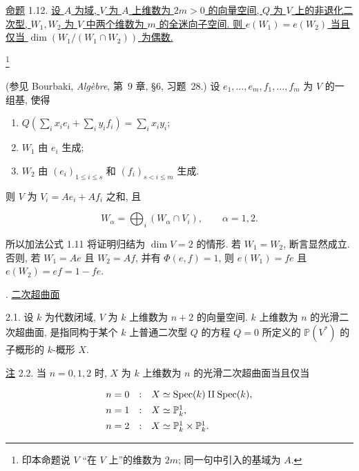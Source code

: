 \underline{命题} 1.12. \underline{设 $A$ 为域, $V$ 为 $A$ 上维数为 $2m>0$ 的向量空间, $Q$ 为 $V$ 上的非退化二次型, $W_1,W_2$ 为 $V$ 中两个维数为 $m$ 的全迷向子空间. 则 $e(W_1)=e(W_2)$ 当且仅当 $\dim(W_1/(W_1\cap W_2))$ 为偶数.}

\footnote{印本命题说 $V$ ``在 $V$ 上''的维数为 $2m$; 同一句中引入的基域为 $A$.}


(参见 Bourbaki, \emph{Algèbre}, 第~9 章, \S6, 习题~28.) 设 $e_1,\ldots,e_m,f_1,\ldots,f_m$ 为 $V$ 的一组基, 使得

\begin{enumerate}[label=\alph*),leftmargin=2.5em]
\item $Q(\sum_i x_i e_i+\sum_i y_i f_i)=\sum_i x_i y_i$;
\item $W_1$ 由 $e_i$ 生成;
\item $W_2$ 由 $(e_i)_{1\leq i\leq s}$ 和 $(f_i)_{s<i\leq m}$ 生成.
\end{enumerate}

则 $V$ 为 $V_i=Ae_i+Af_i$ 之和, 且

\begin{equation*}
W_\alpha=\bigoplus_i(W_\alpha\cap V_i),
\qquad \alpha=1,2.
\end{equation*}

所以加法公式 1.11 将证明归结为 $\dim V=2$ 的情形. 若 $W_1=W_2$, 断言显然成立. 否则, 若 $W_1=Ae$ 且 $W_2=Af$, 并有 $\Phi(e,f)=1$, 则 $e(W_1)=fe$ 且 $e(W_2)=ef=1-fe$.

. \underline{二次超曲面}

2.1. 设 $k$ 为代数闭域, $V$ 为 $k$ 上维数为 $n+2$ 的向量空间. $k$ 上维数为 $n$ 的光滑二次超曲面, 是指同构于某个 $k$ 上普通二次型 $Q$ 的方程 $Q=0$ 所定义的 $\mathbb P(V^*)$ 的子概形的 $k$-概形 $X$.

\underline{注} 2.2. 当 $n=0,1,2$ 时, $X$ 为 $k$ 上维数为 $n$ 的光滑二次超曲面当且仅当

\begin{equation*}
\begin{array}{rcl}
n=0 &:& X\simeq\operatorname{Spec}(k)\amalg\operatorname{Spec}(k),\\[1ex]
n=1 &:& X\simeq\mathbb P^1_k,\\[1ex]
n=2 &:& X\simeq\mathbb P^1_k\times\mathbb P^1_k.
\end{array}
\end{equation*}
